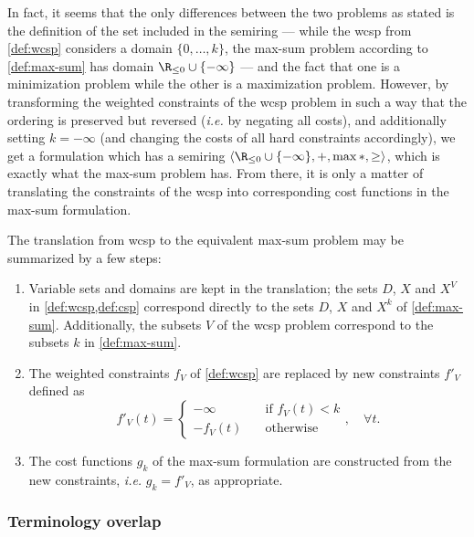 In fact, it seems that the only differences between the two problems as stated is the definition of the set included in the semiring --- while the \gls{wcsp} from \cref{def:wcsp} considers a domain \(\{0,\dotsc,k\}\), the max-sum problem according to \cref{def:max-sum} has domain \(\Rminus \cup \{-\infty\}\) --- and the fact that one is a minimization problem while the other is a maximization problem.
However, by transforming the weighted constraints of the \gls{wcsp} problem in such a way that the ordering is preserved but reversed (\emph{i.e.} by negating all costs), and additionally setting \(k=-\infty\) (and changing the costs of all hard constraints accordingly), we get a formulation which has a semiring \(\langle\Rminus \cup \{-\infty\},+,\max*,\geq\rangle\), which is exactly what the max-sum problem has.
From there, it is only a matter of translating the constraints of the \gls{wcsp} into corresponding cost functions in the max-sum formulation.

The translation from \gls{wcsp} to the equivalent max-sum problem may be summarized by a few steps:
\begin{enumerate}
	\item Variable sets and domains are kept in the translation; the sets \(D\), \(X\) and \(X^V\) in \cref{def:wcsp,def:csp} correspond directly to the sets \(D\), \(X\) and \(X^k\) of \cref{def:max-sum}. Additionally, the subsets \(V\) of the \gls{wcsp} problem correspond to the subsets \(k\) in \cref{def:max-sum}.
	\item The weighted constraints \(f_V\) of \cref{def:wcsp} are replaced by new constraints \(f'_V\) defined as
	\begin{equation*}
		f'_V(t) = \begin{cases}
			-\infty &\quad \text{if \(f_V(t) < k\)} \\
			-f_V(t) &\quad \text{otherwise}
		\end{cases}, \quad \forall t.
	\end{equation*}
	\item The cost functions \(g_k\) of the max-sum formulation are constructed from the new constraints, \emph{i.e.} \(g_k = f'_V\), as appropriate.
\end{enumerate}

\subsubsection{Terminology overlap}
